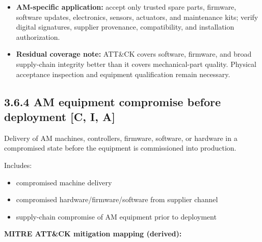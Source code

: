 \documentclass[10pt,a4paper,oneside]{report}
\begin{document}
\begin{itemize}
\item \textbf{AM-specific application:} accept only trusted spare parts, firmware, software updates, electronics, sensors, actuators, and maintenance kits; verify digital signatures, supplier provenance, compatibility, and installation authorization.
\end{itemize}

\begin{itemize}
\item \textbf{Residual coverage note:} ATT\&CK covers software, firmware, and broad supply-chain integrity better than it covers mechanical-part quality. Physical acceptance inspection and equipment qualification remain necessary.
\end{itemize}


\subsection{3.6.4 AM equipment compromise before deployment [C, I, A]}


Delivery of AM machines, controllers, firmware, software, or hardware in a compromised state before the equipment is commissioned into production.

Includes:

\begin{itemize}
\item compromised machine delivery
\item compromised hardware/firmware/software from supplier channel
\item supply-chain compromise of AM equipment prior to deployment
\end{itemize}

\textbf{MITRE ATT\&CK mitigation mapping (derived):}
\end{document}
